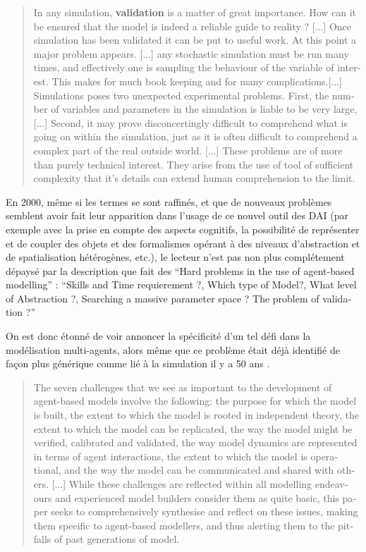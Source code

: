 \foreignblockquote{english}[{\cite[301]{Doran1975}}]{In any simulation, \textbf{validation} is a matter of great importance. How can it be ensured that the model is indeed a reliable guide to reality ? [...] Once simulation has been validated it can be put to useful work. At this point a major problem appears. [...] any stochastic simulation must be run many times, and effectively one is sampling the behaviour of the variable of interest. This makes for much book keeping and for many complications.[...] Simulations poses two unexpected experimental problems. First, the number of variables and parameters in the simulation is liable to be very large, [...] Second, it may prove disconcertingly difficult to comprehend what is going on within the simulation, just as it is often difficult to comprehend a complex part of the real outside world. [...] These problems are of more than purely technical interest. They arise from the use of tool of sufficient complexity that it's details can extend human comprehension to the limit.}

En 2000, même si les termes se sont raffinés, et que de nouveaux problèmes semblent avoir fait leur apparition dans l'usage de ce nouvel outil des DAI (par exemple avec la prise en compte des aspects cognitifs, la possibilité de représenter et de coupler des objets et des formalismes opérant à des niveaux d'abstraction et de spatialisation hétérogènes, etc.), le lecteur n'est pas non plus complétement dépaysé par la description que fait \textcite{Doran2000} des \foreignquote{english}{Hard problems in the use of agent-based modelling} : \foreignquote{english}{Skills and Time requierement ?, Which type of Model?, What level of Abstraction ?, Searching a massive parameter space ? The problem of validation ?}

On est donc étonné de voir \textcites[93-94]{Crooks2012}{Crooks2008} annoncer la spécificité d'un tel défi dans la modélisation multi-agents, alors même que ce problème était déjà identifié de façon plus générique comme lié à la simulation il y a 50 ans \autocites{Naylor1967, Hermann1967}.

\foreignblockquote{english}[{\cite[93-94]{Crooks2012}}]{The seven challenges that we see as important to the development of agent-based models involve the following: the purpose for which the model is built, the extent to which the model is rooted in independent theory, the extent to which the model can be replicated, the way the model might be verified, calibrated and validated, the way model dynamics are represented in terms of agent interactions, the extent to which the model is operational, and the way the model can be communicated and shared with others. [...] While these challenges are reflected within all modelling endeavours and experienced model builders consider them as quite basic, this paper seeks to comprehensively synthesise and reflect on these issues, making them specific to agent-based modellers, and thus alerting them to the pitfalls of past generations of model.}

